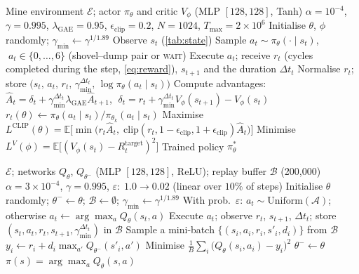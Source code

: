 \documentclass[11pt,a4paper]{article}
\begin{document}
\begin{algorithm}[H]
\caption{PPO for mine truck dispatching}
\label{alg:ppo}
\begin{algorithmic}[1]
\Require Mine environment $\mathcal{E}$; actor $\pi_\theta$ and critic $V_\phi$ (MLP $[128,128]$, Tanh)
\Require $\alpha{=}10^{-4}$, $\gamma{=}0.995$, $\lambda_{\text{GAE}}{=}0.95$, $\epsilon_{\text{clip}}{=}0.2$, $N{=}1024$, $T_{\max}{=}2{\times}10^6$
\State Initialise $\theta$, $\phi$ randomly; $\gamma_{\min}\leftarrow\gamma^{1/1.89}$
   
    \State Observe $s_t$ (\cref{tab:state})
    \State Sample $a_t \sim \pi_\theta(\cdot\mid s_t)$, $\;a_t\in\{0,\ldots,6\}$ (shovel--dump pair or \textsc{wait})
    \State Execute $a_t$; receive $r_t$ (cycles completed during the step, \cref{eq:reward}), $s_{t+1}$ and the duration $\Delta t_t$
    \State Normalise $r_t$; store $\bigl(s_t,\,a_t,\,r_t,\,\gamma_{\min}^{\Delta t_t},\,\log\pi_\theta(a_t\mid s_t)\bigr)$
  \EndFor
  \State Compute advantages: $\hat{A}_t = \delta_t + \gamma_{\min}^{\Delta t_t}\lambda_{\text{GAE}}\hat{A}_{t+1}$,
         $\;\delta_t = r_t + \gamma_{\min}^{\Delta t_t} V_\phi(s_{t+1}) - V_\phi(s_t)$
    \State $r_t(\theta)\leftarrow \pi_\theta(a_t\mid s_t)/\pi_{\theta_k}(a_t\mid s_t)$
    \State Maximise $L^{\text{CLIP}}(\theta)=\mathbb{E}\bigl[\min\bigl(r_t\hat{A}_t,\;\mathrm{clip}(r_t,1{-}\epsilon_{\text{clip}},1{+}\epsilon_{\text{clip}})\hat{A}_t\bigr)\bigr]$
    \State Minimise $L^{V}(\phi)=\mathbb{E}\bigl[(V_\phi(s_t)-R_t^{\text{target}})^2\bigr]$
  \EndFor
\EndFor
\Ensure Trained policy $\pi_\theta^*$
\end{algorithmic}
\end{algorithm}

\begin{algorithm}[H]
\caption{DQN for mine truck dispatching}
\label{alg:dqn}
\begin{algorithmic}[1]
\Require $\mathcal{E}$; networks $Q_\theta$, $Q_{\theta^-}$ (MLP $[128,128]$, ReLU); replay buffer $\mathcal{B}$ (200{,}000)
\Require $\alpha{=}3{\times}10^{-4}$, $\gamma{=}0.995$, $\varepsilon{:}\;1.0\!\to\!0.02$ (linear over $10\%$ of steps)
\State Initialise $\theta$ randomly; $\theta^-\leftarrow\theta$; $\mathcal{B}\leftarrow\emptyset$; $\gamma_{\min}\leftarrow\gamma^{1/1.89}$
  \State With prob.\ $\varepsilon$: $a_t\sim\text{Uniform}(\mathcal{A})$; otherwise $a_t\leftarrow\arg\max_a Q_\theta(s_t,a)$
  \State Execute $a_t$; observe $r_t$, $s_{t+1}$, $\Delta t_t$; store $(s_t,a_t,r_t,s_{t+1},\gamma_{\min}^{\Delta t_t})$ in $\mathcal{B}$
  \State Sample a mini-batch $\{(s_i,a_i,r_i,s'_i,d_i)\}$ from $\mathcal{B}$
  \State $y_i \leftarrow r_i + d_i\max_{a'}Q_{\theta^-}(s'_i,a')$ 
  \State Minimise $\frac{1}{B}\sum_i\bigl(Q_\theta(s_i,a_i)-y_i\bigr)^2$
   $\theta^-\leftarrow\theta$ \EndIf {}
\EndFor
\Ensure $\pi(s)=\arg\max_a Q_\theta(s,a)$
\end{algorithmic}
\end{algorithm}
\end{document}
